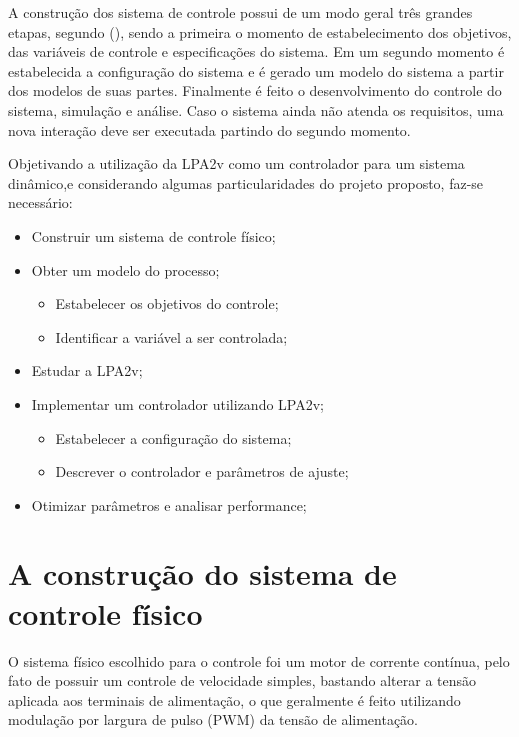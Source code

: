 A construção dos sistema de controle possui de um modo geral três grandes etapas, segundo \citeauthor{dorf2011modern} (\citeyear{dorf2011modern}), sendo a primeira o momento de estabelecimento dos objetivos, das variáveis de controle e especificações do sistema. Em um segundo momento é estabelecida a configuração do sistema e é gerado um modelo do sistema a partir dos modelos de suas partes. Finalmente é feito o desenvolvimento do controle do sistema, simulação e análise. Caso o sistema ainda não atenda os requisitos, uma nova interação deve ser executada partindo do segundo momento.

Objetivando a utilização da LPA2v como um controlador para um sistema dinâmico,e considerando algumas particularidades do projeto proposto, faz-se necessário:

\begin{itemize}
\item Construir um sistema de controle físico;
\item Obter um modelo do processo;
	\begin{itemize}
	\item Estabelecer os objetivos do controle;
	\item Identificar a variável a ser controlada;
	\end{itemize}
\item Estudar a LPA2v;
\item Implementar um controlador utilizando LPA2v;
	\begin{itemize}
	\item Estabelecer a configuração do sistema;
	\item Descrever o controlador e parâmetros de ajuste;
	\end{itemize}
\item Otimizar parâmetros e analisar performance;
\end{itemize}

\section{ A construção do sistema de controle físico }	

O sistema físico escolhido para o controle foi um motor de corrente contínua, pelo fato de possuir um controle de velocidade simples, bastando alterar a tensão aplicada aos terminais de alimentação, o que geralmente é feito utilizando modulação por largura de pulso (PWM) da tensão de alimentação. 

